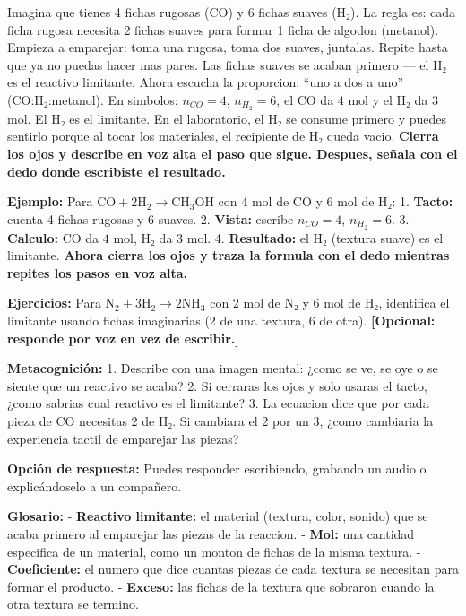 \documentclass[
  spanish,
  letterpaper,
  12pt,
  oneside,
  open=any]{scrbook}
\begin{document}
Imagina que tienes 4 fichas rugosas (CO) y 6 fichas suaves (H₂). La
regla es: cada ficha rugosa necesita 2 fichas suaves para formar 1 ficha
de algodon (metanol). Empieza a emparejar: toma una rugosa, toma dos
suaves, juntalas. Repite hasta que ya no puedas hacer mas pares. Las
fichas suaves se acaban primero --- el H₂ es el reactivo limitante.
Ahora escucha la proporcion: ``uno a dos a uno'' (CO:H₂:metanol). En
simbolos: \(n_{CO} = 4\), \(n_{H_2} = 6\), el CO da \(4\) mol y el H₂ da
\(3\) mol. El H₂ es el limitante. En el laboratorio, el H₂ se consume
primero y puedes sentirlo porque al tocar los materiales, el recipiente
de H₂ queda vacio. \textbf{Cierra los ojos y describe en voz alta el
paso que sigue. Despues, señala con el dedo donde escribiste el
resultado.}

\textbf{Ejemplo:} Para
\(\text{CO} + 2\text{H}_2 \rightarrow \text{CH}_3\text{OH}\) con \(4\)
mol de CO y \(6\) mol de H₂: 1. \textbf{Tacto:} cuenta 4 fichas rugosas
y 6 suaves. 2. \textbf{Vista:} escribe \(n_{CO} = 4\), \(n_{H_2} = 6\).
3. \textbf{Calculo:} CO da \(4\) mol, H₂ da \(3\) mol. 4.
\textbf{Resultado:} el H₂ (textura suave) es el limitante. \textbf{Ahora
cierra los ojos y traza la formula con el dedo mientras repites los
pasos en voz alta.}

\textbf{Ejercicios:} Para
\(\text{N}_2 + 3\text{H}_2 \rightarrow 2\text{NH}_3\) con \(2\) mol de
N₂ y \(6\) mol de H₂, identifica el limitante usando fichas imaginarias
(2 de una textura, 6 de otra). \textbf{{[}Opcional: responde por voz en
vez de escribir.{]}}

\textbf{Metacognición:} 1. Describe con una imagen mental: ¿como se ve,
se oye o se siente que un reactivo se acaba? 2. Si cerraras los ojos y
solo usaras el tacto, ¿como sabrias cual reactivo es el limitante? 3. La
ecuacion dice que por cada pieza de CO necesitas 2 de H₂. Si cambiara el
2 por un 3, ¿como cambiaria la experiencia tactil de emparejar las
piezas?

\textbf{Opción de respuesta:} Puedes responder escribiendo, grabando un
audio o explicándoselo a un compañero.

\textbf{Glosario:} - \textbf{Reactivo limitante:} el material (textura,
color, sonido) que se acaba primero al emparejar las piezas de la
reaccion. - \textbf{Mol:} una cantidad especifica de un material, como
un monton de fichas de la misma textura. - \textbf{Coeficiente:} el
numero que dice cuantas piezas de cada textura se necesitan para formar
el producto. - \textbf{Exceso:} las fichas de la textura que sobraron
cuando la otra textura se termino.
\end{document}
